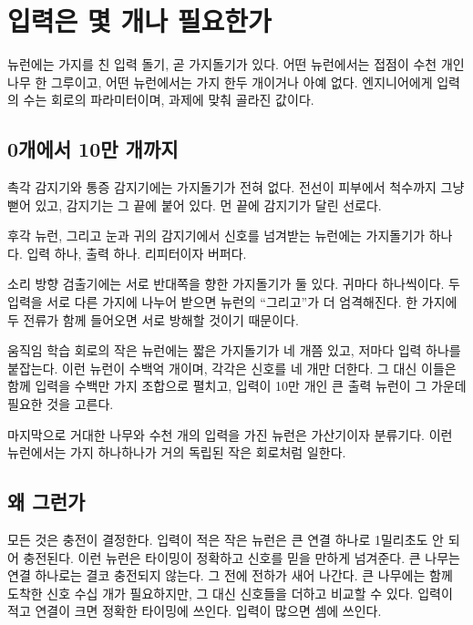 \chapter{입력은 몇 개나 필요한가}

뉴런에는 가지를 친 입력 돌기, 곧 가지돌기가 있다. 어떤 뉴런에서는 접점이 수천 개인 나무 한 그루이고, 어떤 뉴런에서는 가지 한두 개이거나 아예 없다. 엔지니어에게 입력의 수는 회로의 파라미터이며, 과제에 맞춰 골라진 값이다.

\section*{0개에서 10만 개까지}

촉각 감지기와 통증 감지기에는 가지돌기가 전혀 없다. 전선이 피부에서 척수까지 그냥 뻗어 있고, 감지기는 그 끝에 붙어 있다. 먼 끝에 감지기가 달린 선로다.


후각 뉴런, 그리고 눈과 귀의 감지기에서 신호를 넘겨받는 뉴런에는 가지돌기가 하나다. 입력 하나, 출력 하나. 리피터이자 버퍼다.

소리 방향 검출기에는 서로 반대쪽을 향한 가지돌기가 둘 있다. 귀마다 하나씩이다. 두 입력을 서로 다른 가지에 나누어 받으면 뉴런의 “그리고”가 더 엄격해진다. 한 가지에 두 전류가 함께 들어오면 서로 방해할 것이기 때문이다.

움직임 학습 회로의 작은 뉴런에는 짧은 가지돌기가 네 개쯤 있고, 저마다 입력 하나를 붙잡는다. 이런 뉴런이 수백억 개이며, 각각은 신호를 네 개만 더한다. 그 대신 이들은 함께 입력을 수백만 가지 조합으로 펼치고, 입력이 10만 개인 큰 출력 뉴런이 그 가운데 필요한 것을 고른다.

마지막으로 거대한 나무와 수천 개의 입력을 가진 뉴런은 가산기이자 분류기다. 이런 뉴런에서는 가지 하나하나가 거의 독립된 작은 회로처럼 일한다.

\section*{왜 그런가}

모든 것은 충전이 결정한다. 입력이 적은 작은 뉴런은 큰 연결 하나로 1밀리초도 안 되어 충전된다. 이런 뉴런은 타이밍이 정확하고 신호를 믿을 만하게 넘겨준다. 큰 나무는 연결 하나로는 결코 충전되지 않는다. 그 전에 전하가 새어 나간다. 큰 나무에는 함께 도착한 신호 수십 개가 필요하지만, 그 대신 신호들을 더하고 비교할 수 있다. 입력이 적고 연결이 크면 정확한 타이밍에 쓰인다. 입력이 많으면 셈에 쓰인다.


